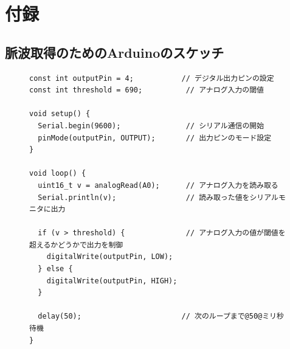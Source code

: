 
\clearpage
\section*{付録}

\subsection*{脈波取得のためのArduinoのスケッチ}

\begin{figure}[h]
  \centering
  \begin{lstlisting}[caption=tutorial.ino, label=src, escapechar=\@]
const int outputPin = 4;           // デジタル出力ピンの設定
const int threshold = 690;          // アナログ入力の閾値

void setup() {
  Serial.begin(9600);               // シリアル通信の開始
  pinMode(outputPin, OUTPUT);       // 出力ピンのモード設定
}

void loop() {
  uint16_t v = analogRead(A0);      // アナログ入力を読み取る
  Serial.println(v);                // 読み取った値をシリアルモニタに出力

  if (v > threshold) {              // アナログ入力の値が閾値を超えるかどうかで出力を制御
    digitalWrite(outputPin, LOW);
  } else {
    digitalWrite(outputPin, HIGH);
  }

  delay(50);                       // 次のループまで@50@ミリ秒待機
}
\end{lstlisting}
\end{figure}
